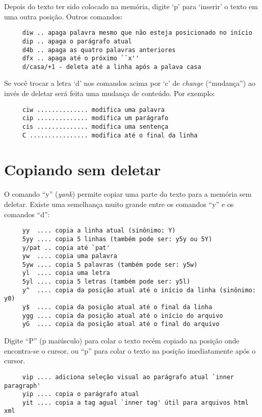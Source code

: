 Depois do texto ter sido colocado na memória, digite `p' para `inserir' o
texto em uma outra posição. Outros comandos:

\begin{verbatim}
     diw .. apaga palavra mesmo que não esteja posicionado no início
     dip .. apaga o parágrafo atual
     d4b .. apaga as quatro palavras anteriores
     dfx .. apaga até o próximo ``x''
     d/casa/+1 - deleta até a linha após a palava casa
\end{verbatim}

Se você trocar a letra `d' nos comandos acima por `c' de {\em change}
(``mudança'') ao invés de deletar será feita uma mudança de conteúdo.  Por
exemplo:

\begin{verbatim}
     ciw .............. modifica uma palavra
     cip .............. modifica um parágrafo
     cis .............. modifica uma sentença
     C ................ modifica até o final da linha
\end{verbatim}

\section{Copiando sem deletar}\label{Copiando sem deletar}

O comando ``y'' ({\em yank}) permite copiar uma parte do texto para a memória sem deletar.
Existe uma semelhança muito grande entre os comandos ``y'' e os comandos ``d'':

\begin{verbatim}
     yy  .... copia a linha atual (sinônimo: Y)
     5yy .... copia 5 linhas (também pode ser: y5y ou 5Y)
     y/pat .. copia até `pat'
     yw  .... copia uma palavra
     5yw .... copia 5 palavras (também pode ser: y5w)
     yl  .... copia uma letra
     5yl .... copia 5 letras (também pode ser: y5l)
     y^  .... copia da posição atual até o início da linha (sinônimo: y0)
     y$  .... copia da posição atual até o final da linha
     ygg .... copia da posição atual até o início do arquivo
     yG  .... copia da posição atual até o final do arquivo
\end{verbatim}

Digite ``P'' (p maiúsculo) para colar o texto recém copiado na posição onde
encontra-se o cursor, ou ``p'' para colar o texto na posição imediatamente
após o cursor.

\begin{verbatim}
     vip .... adiciona seleção visual ao parágrafo atual `inner paragraph'
     yip .... copia o parágrafo atual
     yit .... copia a tag agual `inner tag' útil para arquivos html xml
\end{verbatim}

